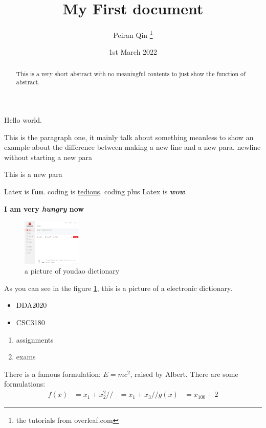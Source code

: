 \documentclass[twocolumn, 12pt, letterpaper, twoside]{article}
\title{My First document}
\author{Peiran Qin \thanks{the tutorials from overleaf.com}}
\date{1st March 2022}
\begin{document}
\maketitle

\tableofcontents

\begin{abstract}
    This is a very short abstract with no meaningful contents to just show the function of abstract.
\end{abstract}

Hello world.

This is the paragraph one, it mainly talk about something meanless to show an example about the difference between making a new line and a new para.
newline without starting a new para


This is a new para

Latex is \textbf{fun}.
coding is \underline{tedious}.
coding plus Latex is \textbf{\textit{wow}}.

\textbf{I am very \emph{hungry} now}

\begin{figure}[h]
    \centering
    \includegraphics[width=0.25\textwidth]{dictionary.JPG}
    \caption{a picture of youdao dictionary}
    \label{fig:dic}
\end{figure}
As you can see in the figure \ref{fig:dic}, this is a picture of a electronic dictionary.

\begin{itemize}
    \item DDA2020
    \item CSC3180
\end{itemize}
\begin{enumerate}
    \item assignments
    \item exams
\end{enumerate}

There is a famous formulation: $E = mc^2 $, raised by Albert.
There are some formulations:
\begin{equation}
\begin{aligned}
    f(x) &= x_1 + x_2^2//
    &= x_1 + x_3//
    g(x) &= x_{100} + 2
\end{aligned}
\end{equation}
\end{document}
